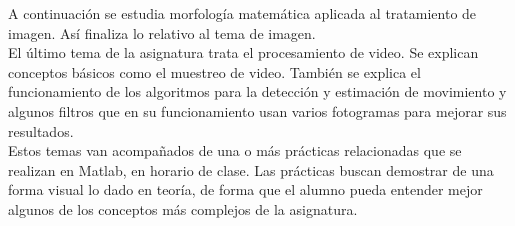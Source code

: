 A continuación se estudia morfología matemática aplicada al tratamiento de imagen. Así finaliza lo relativo al tema de imagen.\\

El último tema de la asignatura trata el procesamiento de video. Se explican conceptos básicos como el muestreo de video. También se explica el funcionamiento de los algoritmos para la detección y estimación de movimiento y algunos filtros que en su funcionamiento usan varios fotogramas para mejorar sus resultados.\\

Estos temas van acompañados de una o más prácticas relacionadas que se realizan en Matlab, en horario de clase. Las prácticas buscan demostrar de una forma visual lo dado en teoría, de forma que el alumno pueda entender mejor algunos de los conceptos más complejos de la asignatura.\\

